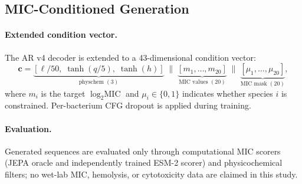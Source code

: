 \subsection{MIC-Conditioned Generation}
\label{sec:mic_gen}

\paragraph{Extended condition vector.}
The AR v4 decoder is extended to a 43-dimensional condition vector:
\begin{equation}
  \mathbf{c} =
  \underbrace{[\ell/50,\;\tanh(q/5),\;\tanh(h)]}_{\text{physchem }(3)}
  \;\|\;
  \underbrace{[m_1,\ldots,m_{20}]}_{\text{MIC values }(20)}
  \;\|\;
  \underbrace{[\mu_1,\ldots,\mu_{20}]}_{\text{MIC mask }(20)},
\end{equation}
where $m_i$ is the target $\log_2\text{MIC}$ and $\mu_i \in \{0,1\}$
indicates whether species $i$ is constrained.
Per-bacterium CFG dropout is applied during training.

\paragraph{Evaluation.}
Generated sequences are evaluated only through computational MIC scorers
(JEPA oracle and independently trained ESM-2 scorer) and
physicochemical filters; no wet-lab MIC, hemolysis, or cytotoxicity data
are claimed in this study.

